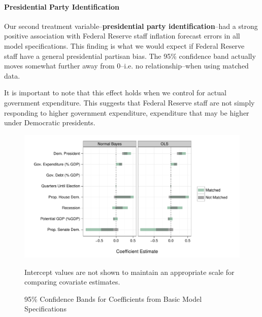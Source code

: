 \documentclass[a4paper]{article}\usepackage{graphicx, color}
\newenvironment{knitrout}{}{} %
\begin{document}
\paragraph{Presidential Party Identification}

Our second treatment variable--{\bf{presidential party identification}}--had a strong positive association with Federal Reserve staff inflation forecast errors in all model specifications. This finding is what we would expect if Federal Reserve staff have a general presidential partisan bias. The 95\% confidence band actually moves somewhat further away from 0--i.e. no relationship--when using matched data.  

It is important to note that this effect holds when we control for actual government expenditure. This suggests that Federal Reserve staff are not simply responding to higher government expenditure, expenditure that may be higher under Democratic presidents.

\begin{figure}[t]
    \caption{95\% Confidence Bands for Coefficients from Basic Model Specifications}
    \label{basicModelsPlot}
    \begin{center}

\begin{knitrout}
\color{fgcolor}\includegraphics[width=0.95\linewidth]{figure/BasicModelPlots} 
\end{knitrout}

    \begin{singlespace}
        {\scriptsize{Intercept values are not shown to maintain an appropriate scale for comparing covariate estimates.}}
    \end{singlespace}
    \end{center}
\end{figure}
\end{document}
